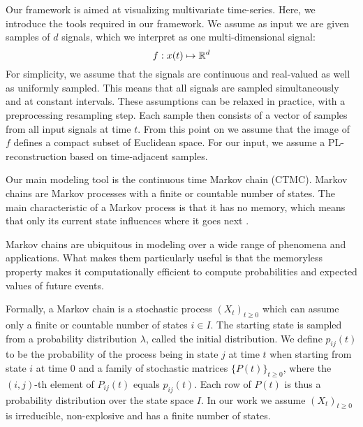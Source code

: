 \label{sec:preliminaries}
Our framework is aimed at visualizing multivariate time-series. Here, we introduce the tools required in our framework. We assume as input we are given samples of $d$ signals, which we interpret as one multi-dimensional signal:
$$f: x(t)\mapsto \mathbb{R}^d$$
For simplicity, we assume that the signals are continuous and real-valued as well as uniformly sampled. This means that all signals are sampled simultaneously and at constant intervals. These assumptions can be relaxed in practice, with a preprocessing resampling step.  Each sample then consists of a vector of samples from all input signals at time $t$. 
From this point on we  assume that the image of $f$ defines a compact subset of Euclidean space. For our input, we assume a PL-reconstruction based on time-adjacent samples. 



Our main modeling tool is the continuous time Markov chain (CTMC). Markov chains are Markov processes with a finite or countable number of states. The main characteristic of a Markov process is that it has no memory, which means that only its current state influences where it goes next \cite{norris1998markov}.

Markov chains are ubiquitous in modeling over a wide range of phenomena and applications. What makes them particularly useful is that the memoryless property makes it computationally efficient to compute probabilities and expected values of future events.

Formally, a Markov chain is a stochastic process $(X_t)_{t \ge 0}$ which can assume 
only a finite or countable number of states $i \in I$. The starting state
is sampled from a probability distribution $\lambda$, called the initial distribution.
We define $p_{ij}(t)$ to be the probability of the process being in state $j$ at time $t$
when starting from state $i$ at time $0$ and a family of stochastic matrices $\{P(t)\}_{t \ge 0}$,
where the $(i,j)$-th element of $P_{ij}(t)$ equals $p_{ij}(t)$.
Each row of $P(t)$ is thus a probability distribution over the state space $I$. In our work we assume $(X_t)_{t \ge 0}$ is irreducible, non-explosive and has a finite number of states. 

